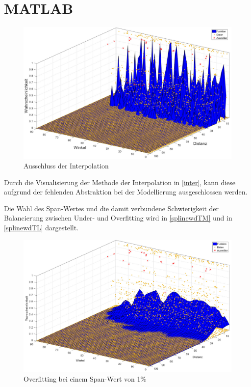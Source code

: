 \chapter{MATLAB}

\begin{figure}[H]
\centering
\includegraphics[scale=0.34]{se-wa-jpg/inter}
\caption{Ausschluss der Interpolation}
\label{inter}
\end{figure}

Durch die Visualisierung der Methode der Interpolation in \vref{inter}, kann diese aufgrund der fehlenden Abstraktion bei der Modellierung ausgeschlossen werden.

Die Wahl des Span-Wertes und die damit verbundene Schwierigkeit der Balancierung zwischen Under- und Overfitting wird in \vref{splinewdTM} und in \vref{splinewdTL} dargestellt.

\begin{figure}[H]
\centering
\includegraphics[scale=0.34]{se-wa-jpg/splinewdTM}
\caption{Overfitting bei einem Span-Wert von 1\%}
\label{splinewdTM}
\end{figure}

